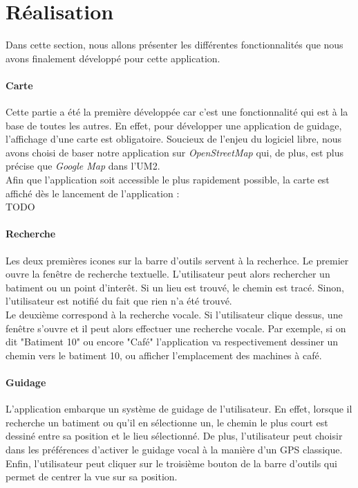 \documentclass{article}
\begin{document}
	\section{Réalisation}
	Dans cette section, nous allons présenter les différentes fonctionnalités que nous avons finalement développé pour cette application.
	
	\paragraph{Carte}
	Cette partie a été la première développée car c'est une fonctionnalité qui est à la base de toutes les autres. En effet, pour développer une application de guidage, l'affichage d'une carte est obligatoire. Soucieux de l'enjeu du logiciel libre, nous avons choisi de baser notre application sur \textit{OpenStreetMap} qui, de plus, est plus précise que \textit{Google Map} dans l'UM2. \\
	Afin que l'application soit accessible le plus rapidement possible, la carte est affiché dès le lancement de l'application : \\
	TODO
	
	\paragraph{Recherche}
	Les deux premières icones sur la barre d'outils servent à la recherhce. Le premier ouvre la fenêtre de recherche textuelle. L'utilisateur peut alors rechercher un batiment ou un point d'interêt. Si un lieu est trouvé, le chemin est tracé. Sinon, l'utilisateur est notifié du fait que rien n'a été trouvé. \\
	Le deuxième correspond à la recherche vocale. Si l'utilisateur clique dessus, une fenêtre s'ouvre et il peut alors effectuer une recherche vocale. Par exemple, si on dit "Batiment 10" ou encore "Café" l'application va respectivement dessiner un chemin vers le batiment 10, ou afficher l'emplacement des machines à café. \\
	
	\paragraph{Guidage}
	L'application embarque un système de guidage de l'utilisateur. En effet, lorsque il recherche un batiment ou qu'il en sélectionne un, le chemin le plus court est dessiné entre sa position et le lieu sélectionné. De plus, l'utilisateur peut choisir dans les préférences d'activer le guidage vocal à la manière d'un GPS classique. \\
	Enfin, l'utilisateur peut cliquer sur le troisième bouton de la barre d'outils qui permet de centrer la vue sur sa position. \\
	
\end{document}
